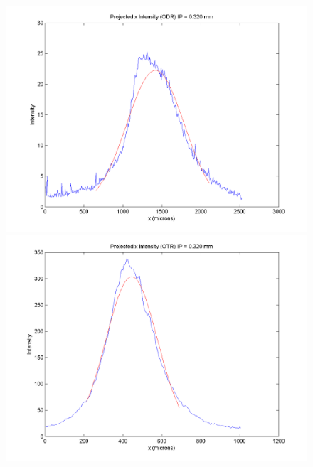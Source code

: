 \documentclass[12pt]{article}
\begin{document}
\begin{figure}
\begin{center}
\includegraphics[scale=0.5]{Figures/ProjX_ODR_320.PNG}
\includegraphics[scale=0.5]{Figures/ProjX_OTR_320.PNG}
\caption{}
\end{center}
\end{figure}
\end{document}
